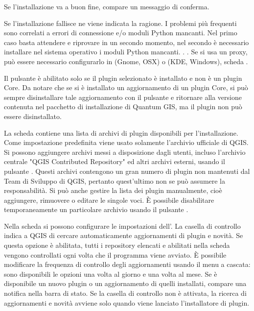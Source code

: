 Se l'installazione va a buon fine, compare un messaggio di conferma. 

Se l'installazione fallisce ne viene indicata la ragione. I problemi più frequenti sono correlati a errori di 
connessione e/o moduli Python mancanti. Nel primo caso basta attendere e riprovare in un secondo momento, 
nel secondo è necessario installare nel sistema operativo i moduli Python mancanti. . . Se si usa un proxy, può essere necessario configurarlo in
 \arrow {} (Gnome, OSX)
o  \arrow {} (KDE, Windows), scheda .

Il pulsante  è abilitato solo se il plugin selezionato è installato e non è un plugin Core. 
Da notare che se si è installato un aggiornamento di un plugin Core, si può sempre disinstallare tale 
aggiornamento con il pulsante  e ritornare alla versione contenuta nel pacchetto di 
installazione di Quantum GIS, ma il plugin non può essere disinstallato.


La scheda  contiene una lista di archivi di plugin disponibili per l'installazione. 
Come impostazione predefinita viene usato solamente l'archivio ufficiale di QGIS. 
Si possono aggiungere archivi messi a disposizione dagli utenti, incluso l'archivio centrale "QGIS Contributed Repository" 
ed altri archivi esterni, usando il pulsante . Questi archivi contengono un gran 
numero di plugin non mantenuti dal Team di Sviluppo di QGIS, pertanto quest'ultimo non se può assumere la responsabilità.
Si può anche gestire la lista dei plugin manualmente, cioè aggiungere, rimuovere o editare le singole voci. 
È possibile disabilitare temporaneamente un particolare archivio usando il pulsante .


Nella scheda  si possono configurare le impostazioni dell'. 
La casella di controllo  indica a QGIS di cercare automaticamente aggiornamenti 
di plugin e novità. Se questa opzione è abilitata, tutti i repository elencati e abilitati 
nella scheda  vengono controllati ogni volta che il programma viene avviato. 
È possibile modificare la frequenza di controllo degli aggiornamenti usando il menu a cascata: sono disponibili le opzioni
una volta al giorno e una volta al mese. Se è disponibile un nuovo plugin o un aggiornamento di quelli 
installati, compare una notifica nella barra di stato. Se la casella di controllo non è attivata, la ricerca di aggiornamenti e 
novità avviene solo quando viene lanciato l'installatore di plugin.

